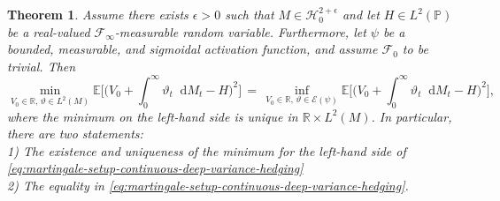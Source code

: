 \documentclass[11pt,a4paper,twoside,openany]{report}
\numberwithin{equation}{section}
\newcommand{\diff}{\mathop{}\!\mathrm{d}}
\theoremstyle{plain} %
\newtheorem{theorem}{Theorem}[section]
\theoremstyle{definition} %
\theoremstyle{remark} %
\begin{document}
\begin{theorem}\label{thm:martingale-setup-continuous-deep-variance-hedging}
Assume there exists \(\epsilon>0\) such that \(M\in\mathcal{H}_0^{2+\epsilon}\) and let \(H\in L^2(\mathbb{P})\) be a real-valued \(\mathcal{F}_{\infty}\)-measurable random variable. Furthermore, let \(\psi\) be a bounded, measurable, and sigmoidal activation function, and assume \(\mathcal{F}_0\) to be trivial. Then
\begin{equation}\label{eq:martingale-setup-continuous-deep-variance-hedging}
    \min_{V_0\in\mathbb{R},\,\vartheta\in L^2(M)}\mathbb{E}\bigg[\bigg(V_0+\int_{0}^{\infty}\vartheta_t\diff M_t-H\bigg)^2\bigg]
    \,=\,\inf_{V_0\in\mathbb{R},\,\vartheta\in\mathcal{E}(\psi)}\mathbb{E}\bigg[\bigg(V_0+\int_{0}^{\infty}\vartheta_t\diff M_t-H\bigg)^2\bigg],
\end{equation}
where the minimum on the left-hand side is unique in \(\mathbb{R}\times L^2(M)\). 
In particular, there are two statements: 
\\1) The existence and uniqueness of the minimum for the left-hand side of \eqref{eq:martingale-setup-continuous-deep-variance-hedging}
\\2) The equality in \eqref{eq:martingale-setup-continuous-deep-variance-hedging}. 
\end{theorem}
\end{document}
